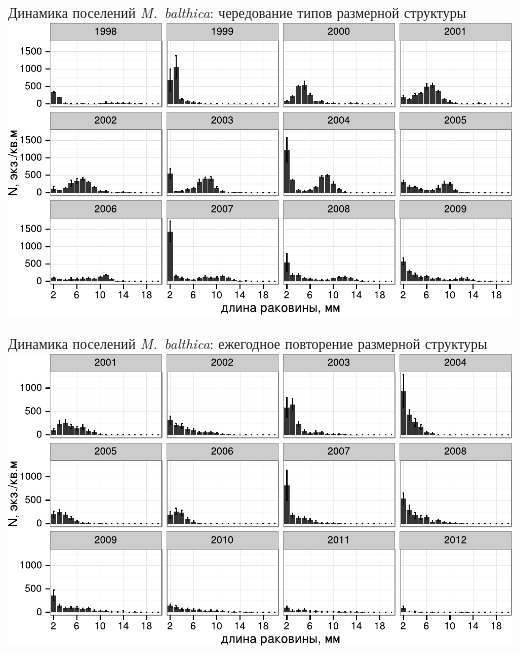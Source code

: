 \documentclass{beamer}
\begin{document}
\begin{frame}{Динамика поселений {\it M.~balthica}: чередование типов размерной структуры}
		\includegraphics[width=\textwidth]{Estuary_sizestr_oneplot1.pdf}
\end{frame}


\begin{frame}{Динамика поселений {\it M.~balthica}: ежегодное повторение размерной структуры}
		\includegraphics[width=\textwidth]{YuG_sizestr_oneplot1.pdf}
\end{frame}

\end{document}
